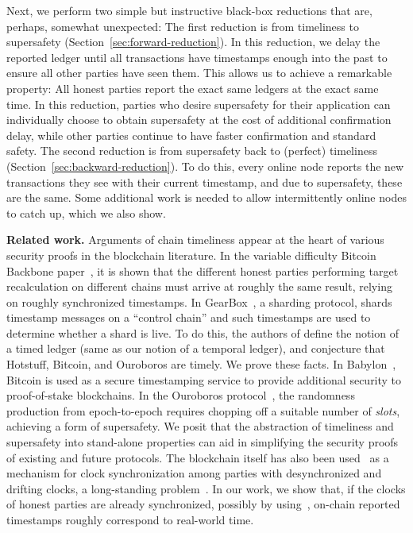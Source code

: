 Next, we perform two simple but instructive black-box reductions that are, perhaps, somewhat unexpected:
The first reduction is from timeliness to supersafety (Section~\ref{sec:forward-reduction}).
In this reduction, we delay the reported ledger until all
transactions have timestamps enough into the past to ensure all other parties have seen them.
This allows us to achieve a remarkable property: All honest parties report the
exact same ledgers at the exact same time.
In this reduction, parties who desire supersafety for their application can individually choose to obtain supersafety at the cost of additional confirmation delay, while other parties continue to have faster confirmation and standard safety.
The second reduction is from supersafety back to (perfect) timeliness (Section~\ref{sec:backward-reduction}).
To do this, every online node reports the new transactions they see with
their current timestamp, and due to supersafety, these are the same.
Some additional work is needed to allow intermittently online nodes to catch up, which we also show.

\noindent
\textbf{Related work.}
Arguments of chain timeliness appear at the heart of various security proofs
in the blockchain literature.
In the variable difficulty Bitcoin Backbone paper~\cite{varbackbone},
it is shown that the different honest parties performing target recalculation on different chains
must arrive at roughly the same result, relying on roughly synchronized timestamps.
In GearBox~\cite{gearbox}, a sharding protocol, shards timestamp messages on a ``control chain'' and such timestamps are used to determine whether a shard is live.
To do this, the authors of \cite{gearbox} define the notion of a timed ledger (same as our notion of a temporal ledger), and conjecture that Hotstuff, Bitcoin, and Ouroboros are timely. We prove these facts.
In Babylon~\cite{babylon}, Bitcoin is used as a secure timestamping service to provide additional security to proof-of-stake blockchains.
In the Ouroboros protocol~\cite{ouroboros},
the randomness production from epoch-to-epoch requires chopping off a suitable number of \emph{slots},
achieving a form of supersafety.
We posit that the abstraction of timeliness and supersafety
into stand-alone properties can aid in simplifying the security proofs
of existing and future protocols.
The blockchain itself has also been used~\cite{klepsydra,chronos}
as a mechanism for clock synchronization among parties with desynchronized and drifting clocks,
a long-standing problem~\cite{lamport-synchronizing-clocks}.
In our work, we show that, if the clocks of honest parties are already synchronized, possibly by using~\cite{klepsydra,chronos},
on-chain reported timestamps roughly correspond to real-world time.

